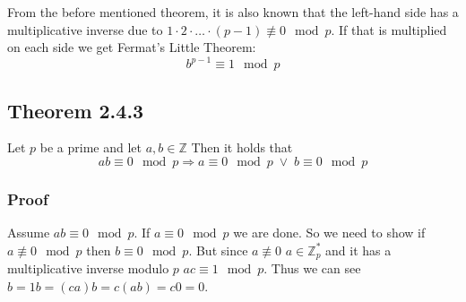 From the before mentioned theorem, it is also known that the left-hand
side has a multiplicative inverse due to $1 \cdot 2 \cdot \ldots \cdot
(p - 1) \not \equiv 0 \mod p$. If that is multiplied on each side we
get Fermat's Little Theorem:
\[b^{p-1} \equiv 1 \mod p \]

\subsection{Theorem 2.4.3}
Let $p$ be a prime and let $a,b \in \mathbb{Z}$ Then it holds that
\[ ab \equiv 0 \mod p \Rightarrow a \equiv 0 \mod p \; \lor \; b
\equiv 0 \mod p\]
\subsubsection*{Proof}
Assume $ab\equiv 0 \mod p$. If $a \equiv 0 \mod p$ we are done. So we
need to show if $a \not \equiv 0 \mod p$ then $b \equiv 0 \mod p$. But
since $a \not \equiv 0$ $a \in \mathbb{Z}_p^*$ and it has a
multiplicative inverse modulo $p$ $ac \equiv 1 \mod p$. Thus we can
see $b = 1b = (ca)b=c(ab)=c0=0$.